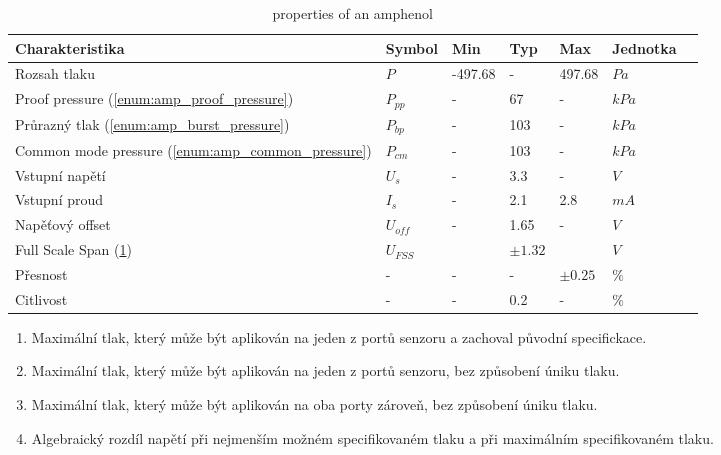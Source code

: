 \begin{table}
    \label{tab:amphenol_properies}
    \caption{properties of an amphenol}
    \begin{tabular}{lllllll}
	\toprule
	Charakteristika                        & Symbol   & Min & Typ & Max   & Jednotka &  \\ \midrule
	Rozsah tlaku                           & $P$      &  -497.68  &   -   &  497.68  & $Pa$ & \\
	Proof pressure (\ref{enum:amp_proof_pressure})                      & $P_{pp}$ &  -  &   67   &  -  & $kPa$ & \\
	Průrazný tlak (\ref{enum:amp_burst_pressure})                       & $P_{bp}$ &  -  &   103   &  -  & $kPa$ & \\
	Common mode pressure (\ref{enum:amp_common_pressure})                & $P_{cm}$ &  -  &   103   &  -  & $kPa$ & \\
	Vstupní napětí                         & $U_{s}$  &  -  & 3.3  &  -  & $V$ &  \\
	Vstupní proud                          & $I_{s}$  &  -  & 2.1  &  2.8  & $mA$ &  \\
	Napěťový offset						   & $U_{off}$&  -  & 1.65 & -  & $V$ &  \\ 
	Full Scale Span (\ref{enum:amp_fss})                    & $U_{FSS}$&     &$\pm 1.32$& & $V$ & \\
	Přesnost							   & - 		  &  -  & - & $\pm 0.25 $  &  $\%$ &\\
	Citlivost                              & - & - & 0.2 & - & $\%$ & \\
	\bottomrule
\end{tabular}    
\begin{enumerate}
		\item \label{enum:amp_proof_pressure} Maximální tlak, který může být aplikován na jeden z portů senzoru a zachoval původní specifickace.
		\item \label{enum:amp_burst_pressure} Maximální tlak, který může být aplikován na jeden z portů senzoru, bez způsobení úniku tlaku.
		\item \label{enum:amp_common_pressure} Maximální tlak, který může být aplikován na oba porty zároveň, bez způsobení úniku tlaku.
		\item \label{enum:amp_fss} Algebraický rozdíl napětí při nejmenším možném specifikovaném tlaku a při maximálním specifikovaném tlaku.
\end{enumerate}
\end{table}

